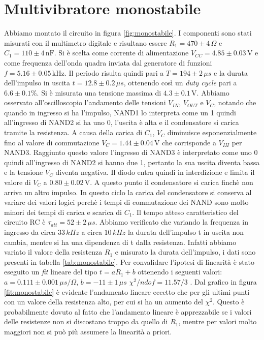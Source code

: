 \documentclass[10pt,a4paper]{article}
\begin{document}
\section{Multivibratore monostabile}
Abbiamo montato il circuito in figura \ref{fig:monostabile}. I componenti sono stati misurati con il multimetro digitale e risultano essere $R_1= 470\pm4\,\Omega$ e $C_1= 110\pm4 \,\text{nF} $. Si è scelta come corrente di alimentazione $V_{CC}= 4.85\pm0.03\,\text{V}$ e come frequenza dell'onda quadra inviata dal generatore di funzioni $f = 5.16\pm0.05\,\text{kHz}$. Il periodo risulta quindi pari a $T=194\pm2\,\mu s$ e la durata dell'impulso in uscita $t=12.8\pm0.2\,\mu s$, ottenendo così un \emph{duty cycle} pari a $6.6\pm0.1\% $. Si è misurata una tensione massima di $4.3\pm0.1\,\text{V}$. Abbiamo osservato all'oscilloscopio l'andamento delle tensioni $V_{IN}$, $V_{OUT}$ e $V_{C}$, notando che quando in ingresso si ha l'impulso, NAND1 lo interpreta come un 1 quindi all'ingresso di NAND2 si ha uno 0, l'uscita è alta e il condensatore si carica tramite la resistenza. A causa della carica di $C_1$, $V_C$ diminuisce esponenzialmente fino al valore di commutazione $V_C=1.44\pm0.04\,\text{V}$ che corrisponde a $V_{IH}$ per NAND3. Raggiunto questo valore l'ingresso di NAND3 è interpretato come uno 0 quindi all'ingresso di NAND2 si hanno due 1, pertanto la sua uscita diventa bassa e la tensione $V_C$ diventa negativa. Il diodo entra quindi in interdizione e limita il valore di $V_C$ a $0.80\pm0.02\,\text{V}$. A questo punto il condensatore si carica finchè non arriva un altro impulso. In questo ciclo la carica del condensatore si conserva al variare dei valori logici perchè i tempi di commutazione dei NAND sono molto minori dei tempi di carica e scarica di $C_1$. Il tempo atteso caratteristico del circuito RC è $\tau_{att}=52\pm2\,\mu s$.
Abbiamo verificato che variando la frequenza in ingresso da circa $33\,kHz$ a circa $10\,kHz$ la durata dell'impulso t in uscita non cambia, mentre si ha una dipendenza di t dalla resistenza. Infatti abbiamo variato il valore della resistenza $R_1$ e misurato la durata dell'impulso, i dati sono presenti in tabella \ref{tab:monostabile}. Per convalidare l'ipotesi di linearità è stato eseguito un \emph{fit} lineare del tipo $t=aR_1+b$ ottenendo i seguenti valori: $a=0.111\pm0.001\,\mu s/\Omega$, $b= -11\pm1\,\mu s$ $\chi^2/ndof=11.57/3$ . Dal grafico in figura \ref{fit:monostabile} è evidente l'andamento lineare eccetto che per gli ultimi punti con un valore della resistenza alto, per cui si ha un aumento del $\chi^2$. Questo è probabilmente dovuto al fatto che l'andamento lineare è apprezzabile se i valori delle resistenze non si discostano troppo da quello di $R_1$, mentre per valori molto maggiori non si può più assumere la linearità a priori.
\end{document}
